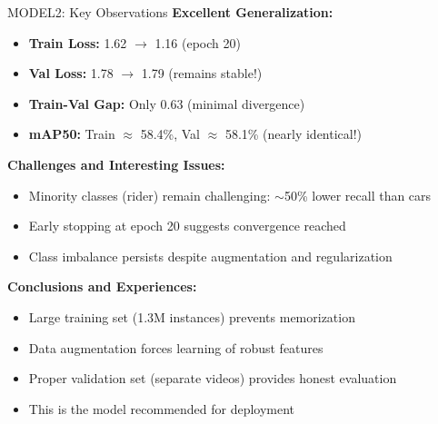 \documentclass{beamer}
\begin{document}
\begin{frame}{MODEL2: Key Observations}
    \textbf{Excellent Generalization:}
    \begin{itemize}
        \item \textbf{Train Loss:} 1.62 $\rightarrow$ 1.16 (epoch 20)
        \item \textbf{Val Loss:} 1.78 $\rightarrow$ 1.79 (remains stable!)
        \item \textbf{Train-Val Gap:} Only 0.63 (minimal divergence)
        \item \textbf{mAP50:} Train $\approx$ 58.4\%, Val $\approx$ 58.1\% (nearly identical!)
    \end{itemize}

    \vspace{0.3cm}
    \textbf{Challenges and Interesting Issues:}
    \begin{itemize}
        \item Minority classes (rider) remain challenging: $\sim$50\% lower recall than cars
        \item Early stopping at epoch 20 suggests convergence reached
        \item Class imbalance persists despite augmentation and regularization
    \end{itemize}

    \vspace{0.3cm}
    \textbf{Conclusions and Experiences:}
    \begin{itemize}
        \item Large training set (1.3M instances) prevents memorization
        \item Data augmentation forces learning of robust features
        \item Proper validation set (separate videos) provides honest evaluation
        \item This is the model recommended for deployment
    \end{itemize}
\end{frame}
\end{document}
